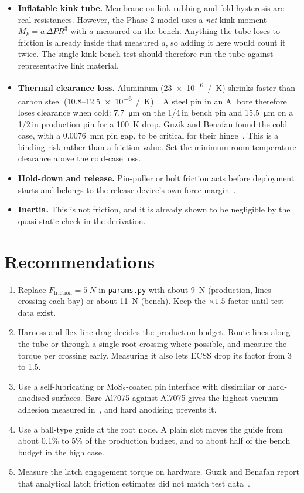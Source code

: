 \documentclass[11pt]{article}
\begin{document}
\begin{itemize}
    \item \textbf{Inflatable kink tube.} Membrane-on-link rubbing and fold hysteresis are real resistances.
    However, the Phase 2 model uses a \emph{net} kink moment $M_k=a\,\Delta P R^3$ with $a$ measured on the
    bench. Anything the tube loses to friction is already inside that measured $a$, so adding it here would
    count it twice. The single-kink bench test should therefore run the tube against representative link
    material.
    \item \textbf{Thermal clearance loss.} Aluminium (\SI{23e-6}{/K}) shrinks faster than carbon steel
    (10.8--\SI{12.5e-6}{/K})~\cite{etb-cte}. A steel pin in an Al bore therefore loses clearance when cold:
    \SI{7.7}{\micro m} on the 1/4\,in bench pin and \SI{15.5}{\micro m} on a 1/2\,in production pin for a
    \SI{100}{K} drop. Guzik and Benafan found the cold case, with a \SI{0.0076}{mm} pin gap, to be critical
    for their hinge~\cite{guzik}. This is a binding risk rather than a friction value. Set the minimum
    room-temperature clearance above the cold-case loss.
    \item \textbf{Hold-down and release.} Pin-puller or bolt friction acts before deployment starts and
    belongs to the release device's own force margin~\cite{guzik}.
    \item \textbf{Inertia.} This is not friction, and it is already shown to be negligible by the
    quasi-static check in the derivation.
\end{itemize}

\section{Recommendations}

\begin{enumerate}[nosep]
    \item Replace $F_{\text{friction}}=\SI{5}{N}$ in \texttt{params.py} with about \SI{9}{N} (production,
    lines crossing each bay) or about \SI{11}{N} (bench). Keep the $\times1.5$ factor until test data exist.
    \item Harness and flex-line drag decides the production budget. Route lines along the tube or through a
    single root crossing where possible, and measure the torque per crossing early. Measuring it also lets
    ECSS drop its factor from 3 to 1.5.
    \item Use a self-lubricating or MoS$_2$-coated pin interface with dissimilar or hard-anodised surfaces.
    Bare Al7075 against Al7075 gives the highest vacuum adhesion measured in~\cite{stm279}, and hard
    anodising prevents it.
    \item Use a ball-type guide at the root node. A plain slot moves the guide from about 0.1\% to 5\% of the
    production budget, and to about half of the bench budget in the high case.
    \item Measure the latch engagement torque on hardware. Guzik and Benafan report that analytical latch
    friction estimates did not match test data~\cite{guzik}.
\end{enumerate}
\end{document}
